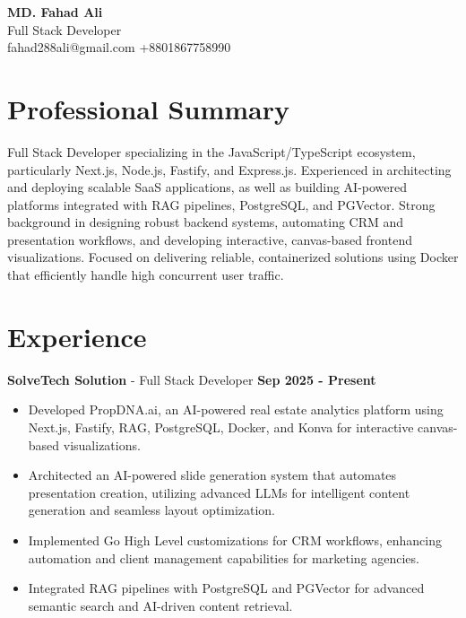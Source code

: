 \documentclass[11pt,a4paper]{article}
\newcommand{\expentry}[3]{%
  \vspace{4pt}%
  \noindent\textbf{#1} - #2 \hfill \textbf{#3}\\[-2pt]%
}
\begin{document}
\begin{center}
  {\huge\textbf{MD. Fahad Ali}}\\[0.3cm]
  Full Stack Developer\\[0.4cm]
  {\footnotesize fahad288ali@gmail.com \textbar{} +8801867758990 \textbar{} }
\end{center}

\vspace{0.2cm}

\section{Professional Summary}
\noindent Full Stack Developer specializing in the JavaScript/TypeScript ecosystem, particularly Next.js, Node.js, Fastify, and Express.js. Experienced in architecting and deploying scalable SaaS applications, as well as building AI-powered platforms integrated with RAG pipelines, PostgreSQL, and PGVector. Strong background in designing robust backend systems, automating CRM and presentation workflows, and developing interactive, canvas-based frontend visualizations. Focused on delivering reliable, containerized solutions using Docker that efficiently handle high concurrent user traffic.


\vspace{0.2cm}

\section{Experience}
\expentry{SolveTech Solution}{Full Stack Developer}{Sep 2025 - Present}
\begin{itemize}
  \item Developed PropDNA.ai, an AI-powered real estate analytics platform using Next.js, Fastify, RAG, PostgreSQL, Docker, and Konva for interactive canvas-based visualizations.
  \item Architected an AI-powered slide generation system that automates presentation creation, utilizing advanced LLMs for intelligent content generation and seamless layout optimization.
  \item Implemented Go High Level customizations for CRM workflows, enhancing automation and client management capabilities for marketing agencies.
  \item Integrated RAG pipelines with PostgreSQL and PGVector for advanced semantic search and AI-driven content retrieval.
\end{itemize}
\end{document}
